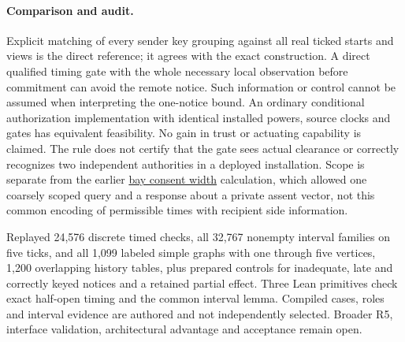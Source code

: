 \documentclass{article}
\begin{document}
\paragraph{Comparison and audit.}
Explicit matching of every sender key grouping against all real
ticked starts and views is the direct reference; it agrees with
the exact construction. A direct qualified timing gate with the
whole necessary local observation before commitment can avoid
the remote notice. Such information or control cannot be assumed
when interpreting the one-notice bound. An ordinary conditional
authorization implementation with identical installed powers,
source clocks and gates has equivalent feasibility. No gain in
trust or actuating capability is claimed. The rule does not certify
that the gate sees actual clearance or correctly recognizes two
independent authorities in a deployed installation.
Scope is separate from the earlier
\href{https://github.com/eternal-november/eos-research-programmes/pull/621}{bay
consent width} calculation, which allowed one coarsely scoped query
and a response about a private assent vector, not this common
encoding of permissible times with recipient side information.

Replayed 24,576 discrete timed checks, all 32,767 nonempty interval
families on five ticks, and all 1,099 labeled simple graphs with
one through five vertices, 1,200 overlapping history tables, plus prepared controls for inadequate,
late and correctly keyed notices and a retained partial effect.
Three Lean primitives check exact half-open timing and the common
interval lemma. Compiled cases, roles and interval evidence are
authored and not independently selected. Broader R5, interface
validation, architectural advantage and acceptance remain open.
\end{document}
